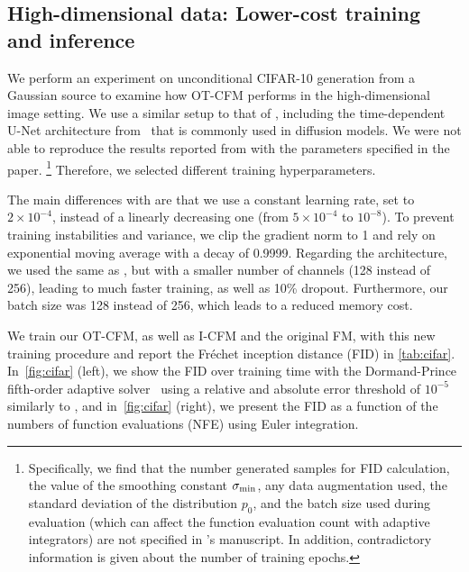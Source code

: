 \documentclass[10pt]{article}
\theoremstyle{plain}
\theoremstyle{definition}
\theoremstyle{remark}
\begin{document}
\subsection{High-dimensional data: Lower-cost training and inference}

We perform an experiment on unconditional CIFAR-10 generation from a Gaussian source to examine how OT-CFM performs in the high-dimensional image setting. We use a similar setup to that of \cite{lipman_flow_2022}, including the time-dependent U-Net architecture from~\citet{nichol_improved_2021} that is commonly used in diffusion models. We were not able to reproduce the results reported from \citet{lipman_flow_2022} with the parameters specified in the paper.
\footnote{Specifically, we find that the number generated samples for FID calculation, the value of the smoothing constant $\sigma_{\rm min}$, any data augmentation used, the standard deviation of the distribution $p_0$, and the batch size used during evaluation (which can affect the function evaluation count with adaptive integrators) are not specified in \citet{lipman_flow_2022}'s manuscript. In addition, contradictory information is given about the number of training epochs.} Therefore, we selected different training hyperparameters.

The main differences with \cite{lipman_flow_2022} are that we use a constant learning rate, set to $2\times10^{-4}$, instead of a linearly decreasing one (from $5\times10^{-4}$ to $10^{-8}$). To prevent training instabilities and variance, we clip the gradient norm to 1 and rely on exponential moving average with a decay of 0.9999. Regarding the architecture, we used the same as \cite{lipman_flow_2022}, but with a smaller number of channels (128 instead of 256), leading to much faster training, as well as 10\% dropout. Furthermore, our batch size was 128 instead of 256, which leads to a reduced memory cost. 

We train our OT-CFM, as well as I-CFM and the original FM, with this new training procedure and report the Fr\'echet inception distance (FID) in \autoref{tab:cifar}. In~\autoref{fig:cifar} (left), we show the FID over training time with the Dormand-Prince fifth-order adaptive solver~\citep[\textsc{dopri5}]{hairer1993solving} using a relative and absolute error threshold of $10^{-5}$ similarly to \cite{lipman_flow_2022}, and in~\autoref{fig:cifar} (right), we present the FID as a function of the numbers of function evaluations (NFE) using Euler integration.
\end{document}
